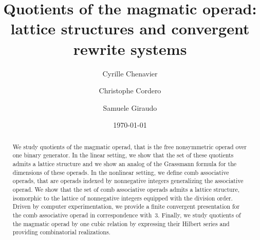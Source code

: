 \documentclass[10pt,reqno]{amsart}
\title[Quotients of the magmatic operad]
      {Quotients of the magmatic operad:\\
        lattice structures and convergent rewrite systems}
\date{\today}
\author{Cyrille Chenavier \and Christophe Cordero \and Samuele Giraudo}
\numberwithin{equation}{subsection}
\begin{document}
\begin{abstract}
    We study quotients of the magmatic operad, that is the free
    nonsymmetric operad over one binary generator. In the linear
    setting, we show that the set of these quotients admits a lattice
    structure and we show an analog of the Grassmann formula for the
    dimensions of these operads. In the nonlinear setting, we define
    comb associative operads, that are operads indexed by nonnegative
    integers generalizing the associative operad. We show that the set
    of comb associative operads admits a lattice structure, isomorphic
    to the lattice of nonnegative integers equipped with the division
    order. Driven by computer experimentation, we provide a finite
    convergent presentation for the comb associative operad in
    correspondence with~$3$. Finally, we study quotients of the magmatic
    operad by one cubic relation by expressing their Hilbert series and
    providing combinatorial realizations.
\end{abstract}

\maketitle

\tableofcontents








\end{document}
